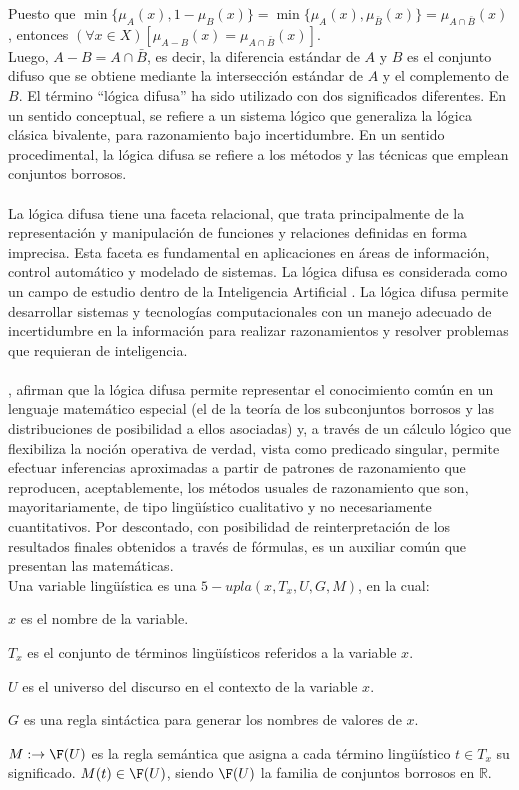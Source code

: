 Puesto que $\min \{\mu_{A}(x), 1 - \mu_{B}(x)\} = \min \{\mu_{A}(x), \mu_{\bar{B}}(x)\} =\mu_{A \cap \bar{B} }(x)$, entonces $(\forall x \in X)[\mu_{A - B }(x) = \mu_{A \cap \bar{B} }(x)]$.
\\
Luego, $A - B = A \cap \bar{B}$, es decir, la diferencia estándar de $A$ y $B$ es el conjunto difuso que se obtiene mediante la intersección estándar de $A$ y el complemento de $B$.
El término ``lógica difusa'' ha sido utilizado con dos significados diferentes. En un sentido conceptual, se refiere a un sistema lógico que generaliza la lógica clásica bivalente, para razonamiento bajo incertidumbre. En un sentido procedimental, la lógica difusa se refiere a los métodos y las técnicas que emplean conjuntos borrosos.\\
\\
La lógica difusa tiene una faceta relacional, que trata principalmente de la
representación y manipulación de funciones y relaciones definidas en forma
imprecisa. Esta faceta es fundamental en aplicaciones en áreas de información, control automático y modelado de sistemas. La lógica difusa es considerada como un campo de estudio dentro de la Inteligencia Artificial \cite[]{yen1999fuzzy}. La lógica difusa permite desarrollar sistemas y tecnologías computacionales con un manejo adecuado de incertidumbre en la información para realizar razonamientos y resolver problemas que requieran de inteligencia.\\
\\
\citet{trillas1992aplicaciones},  afirman que la lógica difusa permite representar el conocimiento común en un lenguaje matemático especial (el de la teoría de los subconjuntos borrosos y las distribuciones de posibilidad a ellos asociadas) y, a través de un cálculo lógico que flexibiliza la noción operativa de verdad, vista como predicado singular, permite efectuar inferencias aproximadas a partir de patrones de razonamiento que reproducen, aceptablemente, los métodos usuales de razonamiento que son, mayoritariamente, de tipo lingüístico cualitativo y no necesariamente cuantitativos. Por descontado, con posibilidad de reinterpretación de los resultados finales obtenidos a través de fórmulas, es un auxiliar común que presentan las matemáticas.\\
Una variable lingüística \cite[]{zadeh1975concept} es una $5-upla(x, T_{x}, U, G, M)$, en la cual:
\begin{viñetas}
\item $x$ es el nombre de la variable.
\item $T_{x}$ es el conjunto de términos lingüísticos referidos a la variable $x$.
\item $U$ es el universo del discurso en el contexto de la variable $x$.
\item $G$ es una regla sintáctica para generar los nombres de valores de $x$. 
\item $M: \rightarrow \F (U)$ es la regla semántica que asigna a cada término lingüístico $t \in T_{x}$ su significado. $M(t) \in \F (U)$, siendo $\F (U)$ la familia de conjuntos borrosos en $\mathbb{R}$.
\end{viñetas}

